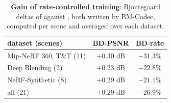 \begin{table}[t]\centering\footnotesize
\caption{\textbf{Gain of rate-controlled training}: Bjontegaard deltas of \BM against \MSc, both written by BM-Codec, computed per scene and averaged over each dataset.}
\label{tab:bd-train}
\begin{tabular}{@{}lcc@{}}
\toprule
dataset (scenes) & BD-PSNR & BD-rate \\
\midrule
Mip-NeRF 360, T\&T (11) & $+0.30$ dB & $-31.3\%$ \\
Deep Blending (2) & $+0.23$ dB & $-22.8\%$ \\
NeRF-Synthetic (8) & $+0.29$ dB & $-21.1\%$ \\
all (21) & $+0.29$ dB & $-26.9\%$ \\
\bottomrule
\end{tabular}
\end{table}

